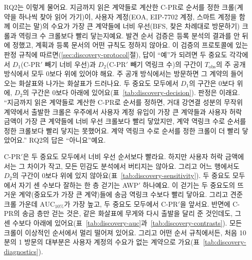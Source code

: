 RQ2는 이렇게 물어요. 지금까지 읽은 계약들로 계산한 \mbox{C-PR}로 순서를 정한 크롤(계약을 하나씩 찾아 읽어 가기)이, 사용자 계정(EOA, EIP-7702 계정, 스마트 계정을 함께 이르는 말)의 수요가 가장 큰 계약들에 너비 우선(BFS, 찾은 차례대로 방문하기) 크롤과 역링크 수 크롤보다 빨리 닿는지예요. 발견 순서 검증은 등록 분석의 결과를 안 뒤에 정했고, 계획과 등록 문서의 어떤 규칙도 정하지 않아요. 이 검증의 프로토콜에 있는 판정 규칙에 따르면(\ref{sec:discovery-protocol}절), 답이 “예”가 되려면 두 중요도 각각에서 $D_1$(\mbox{C-PR}$'$ 빼기 너비 우선)과 $D_2$(\mbox{C-PR}$'$ 빼기 역링크 수)의 구간이 $T_{\mathrm{obs}}$의 주 공개 방식에서 모두 0보다 위에 있어야 해요. 주 공개 방식에서는 방문하면 그 계약의 들어오는 화살표와 나가는 화살표가 드러나요. 두 중요도 모두에서 $D_1$의 구간은 0보다 위에, $D_2$의 구간은 0보다 아래에 있어요(표~\ref{tab:discovery-decision}). 판정은 이래요. “지금까지 읽은 계약들로 계산한 \mbox{C-PR}로 순서를 정하면, 거대 강연결 성분의 무작위 계약에서 출발한 크롤은 우주에서 사용자 계정 유입이 가장 큰 계약들과 사용자 허락 금액이 가장 큰 계약들에 너비 우선 크롤보다 빨리 닿았지만, 계약 역링크 수로 순서를 정한 크롤보다 빨리 닿지는 못했어요. 계약 역링크 수로 순서를 정한 크롤이 더 빨리 닿았어요.” RQ2의 답은 “아니요”예요.

\mbox{C-PR}$'$은 두 중요도 모두에서 너비 우선 순서보다 빨라요. 하지만 사용자 허락 금액에서는 그 차이가 작고, 모든 민감도 분석에서 버티지는 않아요. 그리고 어느 행에서도 $D_2$의 구간이 0보다 위에 있지 않아요(표~\ref{tab:discovery-sensitivity}). 두 중요도 모두에서 자기 센 수보다 잘하는 한 층 걷기는 AWP$'$ 하나예요. 이 걷기는 두 중요도의 뜨거운 계약(중요도가 가장 큰 계약)들에 송금 역링크 수보다 빨리 닿아요. 그리고 견준 크롤 가운데 $\mathrm{AUC}_{10\%}$가 가장 높고, 두 중요도 모두에서 \mbox{C-PR}$'$을 앞서요. 반면에 \mbox{C-PR}의 송금 층만 걷는 것은, 같은 화살표에 무게와 다시 출발을 달리 준 것인데도, 그 센 수보다 아래에 있어요(표~\ref{tab:discovery-auc}과~\ref{tab:discovery-contrasts}). 모든 크롤이 이상적인 순서에서 멀리 떨어져 있어요. 그리고 어떤 순서 규칙에서든, 처음 10분의 1 방문의 대부분은 사용자 계정의 수요가 없는 계약으로 가요(표~\ref{tab:discovery-diagnostics}).

